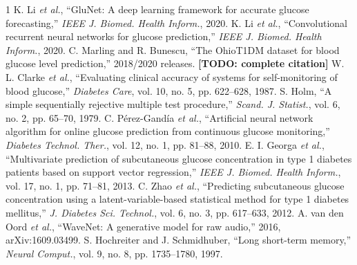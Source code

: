 \documentclass[conference]{IEEEtran}
\newcommand{\TODO}[1]{\textbf{[TODO: #1]}}
\begin{document}
\begin{thebibliography}{1}
 K. Li \emph{et al.}, ``GluNet: A deep learning framework for accurate glucose forecasting,'' \emph{IEEE J. Biomed. Health Inform.}, 2020.
 K. Li \emph{et al.}, ``Convolutional recurrent neural networks for glucose prediction,'' \emph{IEEE J. Biomed. Health Inform.}, 2020.
 C. Marling and R. Bunescu, ``The OhioT1DM dataset for blood glucose level prediction,'' 2018/2020 releases. \TODO{complete citation}
 W. L. Clarke \emph{et al.}, ``Evaluating clinical accuracy of systems for self-monitoring of blood glucose,'' \emph{Diabetes Care}, vol. 10, no. 5, pp. 622--628, 1987.
 S. Holm, ``A simple sequentially rejective multiple test procedure,'' \emph{Scand. J. Statist.}, vol. 6, no. 2, pp. 65--70, 1979.
 C. P\'erez-Gand\'ia \emph{et al.}, ``Artificial neural network algorithm for online glucose prediction from continuous glucose monitoring,'' \emph{Diabetes Technol. Ther.}, vol. 12, no. 1, pp. 81--88, 2010.
 E. I. Georga \emph{et al.}, ``Multivariate prediction of subcutaneous glucose concentration in type 1 diabetes patients based on support vector regression,'' \emph{IEEE J. Biomed. Health Inform.}, vol. 17, no. 1, pp. 71--81, 2013.
 C. Zhao \emph{et al.}, ``Predicting subcutaneous glucose concentration using a latent-variable-based statistical method for type 1 diabetes mellitus,'' \emph{J. Diabetes Sci. Technol.}, vol. 6, no. 3, pp. 617--633, 2012.
 A. van den Oord \emph{et al.}, ``WaveNet: A generative model for raw audio,'' 2016, arXiv:1609.03499.
 S. Hochreiter and J. Schmidhuber, ``Long short-term memory,'' \emph{Neural Comput.}, vol. 9, no. 8, pp. 1735--1780, 1997.
\end{thebibliography}
\end{document}
